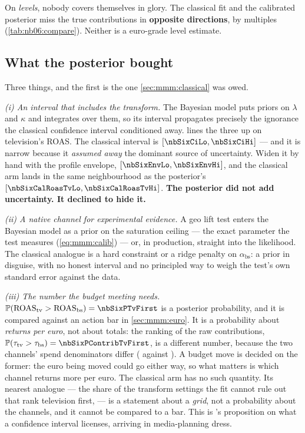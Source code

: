 On \emph{levels}, nobody covers themselves in glory. The classical fit and the calibrated posterior
miss the true contributions in \textbf{opposite directions}, by multiples (\cref{tab:nb06:compare}).
Neither is a euro-grade level estimate.

\subsection*{What the posterior bought}

Three things, and the first is the one \cref{sec:mmm:classical} was owed.

\emph{(i) An interval that includes the transform.} The Bayesian model puts priors on $\lambda$ and
$\kappa$ and integrates over them, so its interval propagates precisely the ignorance the classical
confidence interval conditioned away.  lines the three up on television's ROAS.
The classical interval is $[\nbSixCiLo, \nbSixCiHi]$ --- and it is narrow because it \emph{assumed
away} the dominant source of uncertainty. Widen it by hand with the profile envelope,
$[\nbSixEnvLo, \nbSixEnvHi]$, and the classical arm lands in the same neighbourhood as the
posterior's $[\nbSixCalRoasTvLo, \nbSixCalRoasTvHi]$. \textbf{The posterior did not add
uncertainty. It declined to hide it.}

\emph{(ii) A native channel for experimental evidence.} A geo lift test enters the Bayesian model
as a prior on the saturation ceiling --- the exact parameter the test measures
(\cref{eq:mmm:calib}) --- or, in production, straight into the likelihood. The classical analogue
is a hard constraint or a ridge penalty on $\alpha_{\text{bs}}$: a prior in disguise, with no
honest interval and no principled way to weigh the test's own standard error against the data.

\emph{(iii) The number the budget meeting needs.}
$\Prob(\text{ROAS}_{\text{tv}} > \text{ROAS}_{\text{bs}}) = \nbSixPTvFirst$ is a posterior
probability, and it is compared against an action bar in \cref{sec:mmm:euro}. It is a probability
about \emph{returns per euro}, not about totals: the ranking of the raw contributions,
$\Prob(\tau_{\text{tv}} > \tau_{\text{bs}}) = \nbSixPContribTvFirst$, is a different number, because
the two channels' spend denominators differ (\eur{\nbSixSpendTv} against \eur{\nbSixSpendBs}). A
budget move is decided on the former: the euro being moved could go either way, so what matters is
which channel returns more per euro. The classical arm has no such quantity. Its
nearest analogue --- the share of the transform settings the fit cannot rule out that rank
television first, \pc{\nbSixRegRankOk} --- is a statement about a \emph{grid}, not a probability
about the channels, and it cannot be compared to a bar. This is 's
proposition on what a confidence interval licenses, arriving in media-planning dress.

